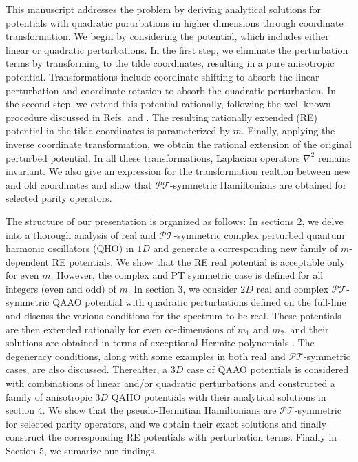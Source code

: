 \documentclass[a4paper, 12pt]{article}
\begin{document}
This manuscript addresses the problem by deriving analytical solutions for potentials with quadratic pururbations in higher dimensions through coordinate transformation. We begin by considering the potential, which includes either linear or quadratic perturbations. In the first step, we eliminate the perturbation terms by transforming to the tilde coordinates, resulting in a pure anisotropic potential. Transformations include coordinate shifting to absorb the linear perturbation and coordinate rotation to absorb the quadratic perturbation. In the second step, we extend this potential rationally, following the well-known procedure discussed in Refs. \cite{marquette2013two} and \cite{Kumar:2024tsz} . The resulting rationally extended (RE) potential in the tilde coordinates is parameterized by $m$. Finally, applying the inverse coordinate transformation, we obtain the rational extension of the original perturbed potential. In all these transformations, Laplacian operators $\nabla^2$ remains invariant. We also give an expression for the transformation realtion between new and old coordinates and show that $\mathcal{PT}$-symmetric Hamiltonians are obtained for selected parity operators. 

The structure of our presentation is organized as follows: 
In sections $2$, we delve into a thorough analysis of real and $\mathcal {PT}$-symmetric complex perturbed quantum harmonic oscillators (QHO) in $1D$ and generate a corresponding new family of $m$-dependent RE potentials. We show that the RE real potential is acceptable only for even $m$. However, the complex and PT symmetric case is defined for all integers (even and odd) of $m$. In section $3$, we consider $2D$ real and complex $\mathcal{PT}$-symmetric QAAO potential with quadratic perturbations defined on the full-line and discuss the various conditions for the spectrum to be real. These potentials are then extended rationally for even co-dimensions of $m_1$ and $m_2$, and their solutions are obtained in terms of exceptional Hermite polynomials . The degeneracy conditions, along with some examples in both real and $\mathcal{PT}$-symmetric cases, are also discussed. Thereafter, a $3D$ case of QAAO potentials is considered with combinations of linear and/or quadratic perturbations and constructed a family of anisotropic $3D$ QAHO potentials with their analytical solutions in section $4$. We show that the pseudo-Hermitian Hamiltonians are $\mathcal{PT}$-symmetric for selected parity operators, and we obtain their exact solutions and finally construct the corresponding RE  potentials with perturbation terms. Finally in Section $5$, we sumarize our findings.
\end{document}
